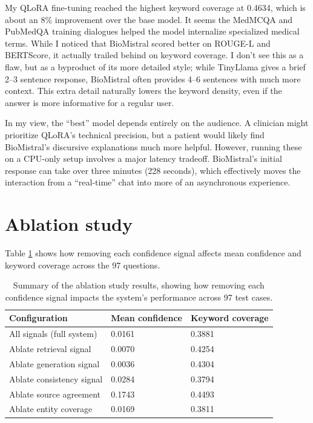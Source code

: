 My QLoRA fine-tuning reached the highest keyword coverage at 0.4634, which is about an 8\% improvement over the base model. It seems the MedMCQA and PubMedQA training dialogues helped the model internalize specialized medical terms. While I noticed that BioMistral scored better on ROUGE-L and BERTScore, it actually trailed behind on keyword coverage. I don't see this as a flaw, but as a byproduct of its more detailed style; while TinyLlama gives a brief 2--3 sentence response, BioMistral often provides 4--6 sentences with much more context. This extra detail naturally lowers the keyword density, even if the answer is more informative for a regular user.

In my view, the ``best'' model depends entirely on the audience. A clinician might prioritize QLoRA's technical precision, but a patient would likely find BioMistral's discursive explanations much more helpful. However, running these on a CPU-only setup involves a major latency tradeoff. BioMistral's initial response can take over three minutes (228 seconds), which effectively moves the interaction from a ``real-time'' chat into more of an asynchronous experience.

\section{Ablation study}

Table \ref{tab:ablation} shows how removing each confidence signal affects mean confidence and keyword coverage across the 97 questions.

\begin{table}[htbp]
\centering
\caption{Summary of the ablation study results, showing how removing each confidence signal impacts the system's performance across 97 test cases.}
\label{tab:ablation}
\renewcommand{\arraystretch}{1.3}
\begin{tabular}{|l|l|l|}
\hline
\textbf{Configuration} & \textbf{Mean confidence} & \textbf{Keyword coverage} \\
\hline
All signals (full system) & 0.0161 & 0.3881 \\
Ablate retrieval signal & 0.0070 & 0.4254 \\
Ablate generation signal & 0.0036 & 0.4304 \\
Ablate consistency signal & 0.0284 & 0.3794 \\
Ablate source agreement & 0.1743 & 0.4493 \\
Ablate entity coverage & 0.0169 & 0.3811 \\
\hline
\end{tabular}
\end{table}

